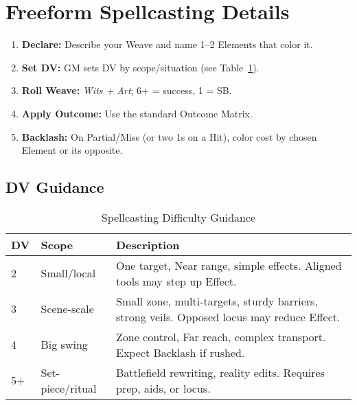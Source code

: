 \section{Freeform Spellcasting Details}
\label{sec:freeform-details}

\begin{enumerate}
  \item \textbf{Declare:} Describe your Weave and name 1--2 Elements that color it.
  \item \textbf{Set DV:} GM sets DV by scope/situation (see Table~\ref{tab:dv-guidance}). 
  \item \textbf{Roll Weave:} \emph{Wits + Art}; 6+ = success, 1 = SB. 
  \item \textbf{Apply Outcome:} Use the standard Outcome Matrix. 
  \item \textbf{Backlash:} On Partial/Miss (or two 1s on a Hit), color cost by chosen Element or its opposite.
\end{enumerate}

\subsection{DV Guidance}
\label{subsec:dv-guidance}
\begin{table}[htbp]
\centering
\begin{tabular}{p{1.6cm}p{3.4cm}p{8.6cm}}
\toprule
\textbf{DV} & \textbf{Scope} & \textbf{Description} \\
\midrule
2 & Small/local & One target, Near range, simple effects. Aligned tools may step up Effect. \\
3 & Scene-scale & Small zone, multi-targets, sturdy barriers, strong veils. Opposed locus may reduce Effect. \\
4 & Big swing & Zone control, Far reach, complex transport. Expect Backlash if rushed. \\
5+ & Set-piece/ritual & Battlefield rewriting, reality edits. Requires prep, aids, or locus. \\
\bottomrule
\end{tabular}
\caption{Spellcasting Difficulty Guidance}
\label{tab:dv-guidance}
\end{table}

